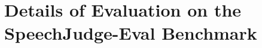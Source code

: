 \documentclass[]{bytedance_seed}
\begin{document}





\section{Details of Evaluation on the SpeechJudge-Eval Benchmark}
\label{app:details-of-evaluation-on-speechjudgeval}
\end{document}
